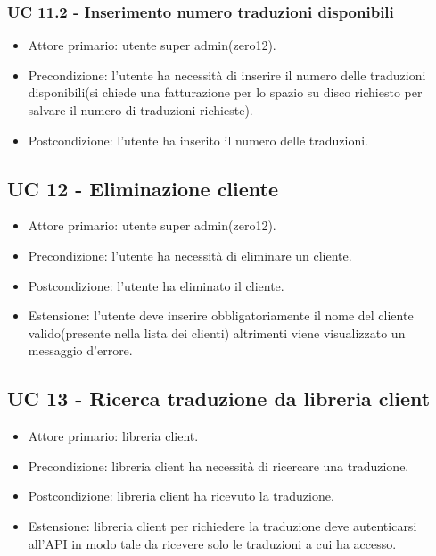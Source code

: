     \subsubsection{UC 11.2 - Inserimento numero traduzioni disponibili}
        \begin{itemize}
            \item Attore primario: utente super admin(zero12).
            \item Precondizione: l'utente ha necessità di inserire il numero delle traduzioni disponibili(si chiede una fatturazione per lo spazio su disco richiesto per salvare il numero di traduzioni richieste).
            \item Postcondizione: l'utente ha inserito il numero delle traduzioni.
        \end{itemize}
\subsection{UC 12 - Eliminazione cliente}
    \begin{itemize}
        \item Attore primario: utente super admin(zero12).
        \item Precondizione: l'utente ha necessità di eliminare un cliente.
        \item Postcondizione: l'utente ha eliminato il cliente.
        \item Estensione: l'utente deve inserire obbligatoriamente il nome del cliente valido(presente nella lista dei clienti) altrimenti viene visualizzato un messaggio d'errore.
    \end{itemize}
\subsection{UC 13 - Ricerca traduzione da libreria client}
    \begin{itemize}
        \item Attore primario: libreria client.
        \item Precondizione: libreria client ha necessità di ricercare una traduzione.
        \item Postcondizione: libreria client ha ricevuto la traduzione.
        \item Estensione: libreria client per richiedere la traduzione deve autenticarsi all'API in modo tale da ricevere solo le traduzioni a cui ha accesso.
    \end{itemize}

